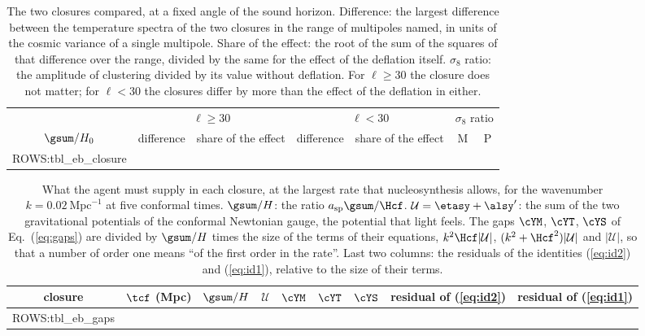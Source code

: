 \begin{table}
\caption{\label{tab:xclosure}The two closures compared, at a fixed angle of the sound horizon.
Difference: the largest difference between the temperature spectra of the two closures in the range
of multipoles named, in units of the cosmic variance of a single multipole. Share of the effect: the
root of the sum of the squares of that difference over the range, divided by the same for the effect
of the deflation itself. $\sigma_8$ ratio: the amplitude of clustering divided by its value without
deflation. For $\ell\ge30$ the closure does not matter; for $\ell<30$ the closures differ by more
than the effect of the deflation in either.}
\begin{ruledtabular}
\begin{tabular}{ccccccc}
 & \multicolumn{2}{c}{$\ell\ge30$} & \multicolumn{2}{c}{$\ell<30$} & \multicolumn{2}{c}{$\sigma_8$ ratio} \\
$\gsum/H_0$ & difference & share of the effect & difference & share of the effect & M & P \\
\hline
{{ROWS:tbl_eb_closure}}
\end{tabular}
\end{ruledtabular}
\end{table}

\begin{table}
\caption{\label{tab:xgaps}What the agent must supply in each closure, at the largest rate that
nucleosynthesis allows, for the wavenumber $k=0.02~\mathrm{Mpc}^{-1}$ at five conformal times.
$\gsum/H$: the ratio $a_{\mathrm{sp}}\gsum/\Hcf$. $\mathcal{U}=\etasy+\alsy'$: the sum of the two
gravitational potentials of the conformal Newtonian gauge, the potential that light feels. The gaps
$\cYM$, $\cYT$, $\cYS$ of Eq.~(\ref{eq:gaps}) are divided by $\gsum/H$ times the size of the terms of
their equations, $k^{2}\Hcf|\mathcal{U}|$, $(k^{2}+\Hcf^{2})|\mathcal{U}|$ and $|\mathcal{U}|$, so
that a number of order one means ``of the first order in the rate''. Last two columns: the residuals
of the identities (\ref{eq:id2}) and (\ref{eq:id1}), relative to the size of their terms.}
\begin{ruledtabular}
\begin{tabular}{ccccccccc}
closure & $\tcf$ (Mpc) & $\gsum/H$ & $\mathcal{U}$ & $\cYM$ & $\cYT$ & $\cYS$ & residual of (\ref{eq:id2}) & residual of (\ref{eq:id1}) \\
\hline
{{ROWS:tbl_eb_gaps}}
\end{tabular}
\end{ruledtabular}
\end{table}

